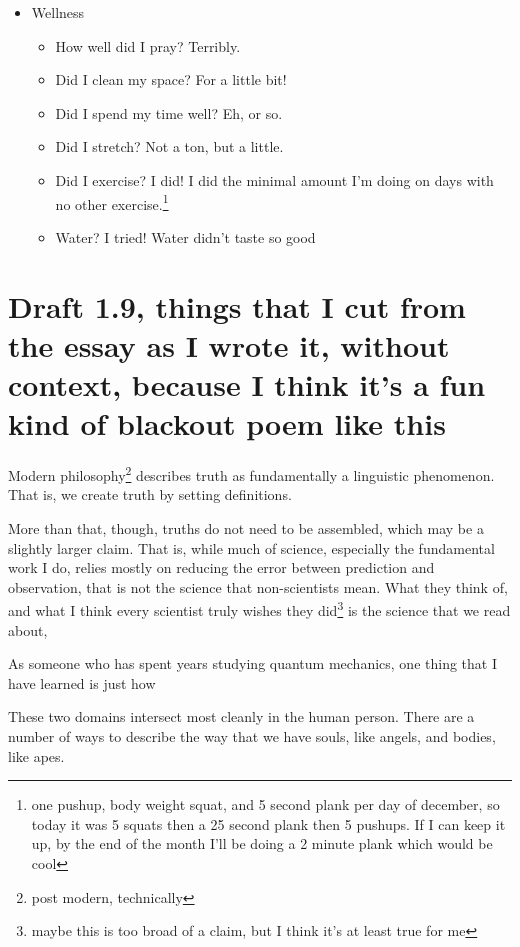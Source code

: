 \documentclass[12pt]{article}[titlepage]
\renewcommand{\,}{\textsuperscript{,}}
\begin{document}
\begin{itemize}
\begin{itemize}
\item Letter to friends? Nope!
\item Paper? I replotted the better data, and it does look better, which is really nice. Now I'm just confused about how distortion constants work.\footnote{or, more accurately, how they don't work}
\end{itemize}
\item Wellness
\begin{itemize}
\item How well did I pray? Terribly.
\item Did I clean my space? For a little bit!
\item Did I spend my time well? Eh, or so.
\item Did I stretch? Not a ton, but a little.
\item Did I exercise? I did! I did the minimal amount I'm doing on days with no other exercise.\footnote{one pushup, body weight squat, and 5 second plank per day of december, so today it was 5 squats then a 25 second plank then 5 pushups. If I can keep it up, by the end of the month I'll be doing a 2 minute plank which would be cool}
\item Water? I tried! Water didn't taste so good
\end{itemize}
\end{itemize}

\section{Draft 1.9, things that I cut from the essay as I wrote it, without context, because I think it's a fun kind of blackout poem like this}
Modern philosophy\footnote{post modern, technically} describes truth as fundamentally a linguistic phenomenon.
That is, we create truth by setting definitions.


More than that, though, truths do not need to be assembled, which may be a slightly larger claim.
That is, while much of science, especially the fundamental work I do, relies mostly on reducing the error between prediction and observation, that is not the science that non-scientists mean.
What they think of, and what I think every scientist truly wishes they did\footnote{maybe this is too broad of a claim, but I think it's at least true for me} is the science that we read about, 

As someone who has spent years studying quantum mechanics, one thing that I have learned is just how 

These two domains intersect most cleanly in the human person.
There are a number of ways to describe the way that we have souls, like angels, and bodies, like apes.
\end{document}
